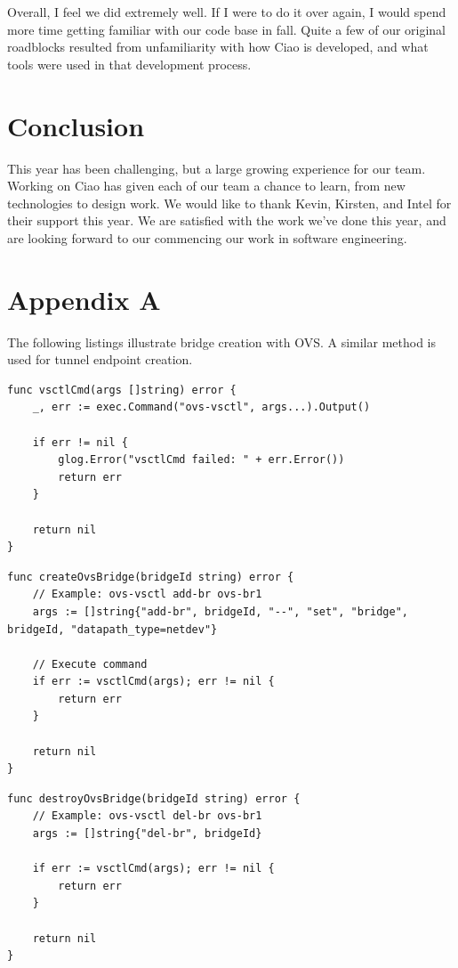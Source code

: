 \documentclass[10pt,onecolumn,journal,draftclsnofoot]{IEEEtran}
\begin{document}
Overall, I feel we did extremely well. If I were to do it over again, I would spend more time getting familiar with our code base in fall. Quite a few of our original roadblocks resulted from unfamiliarity with how Ciao is developed, and what tools were used in that development process.

\section{Conclusion}
This year has been challenging, but a large growing experience for our team. Working on Ciao has given each of our team a chance to learn, from new technologies to design work. We would like to thank Kevin, Kirsten, and Intel for their support this year. We are satisfied with the work we've done this year, and are looking forward to our commencing our work in software engineering.




\section{Appendix A}
The following listings illustrate bridge creation with OVS. A similar method is used for tunnel endpoint creation.

\begin{lstlisting}[caption=Calling the OVS command tool]
func vsctlCmd(args []string) error {
	_, err := exec.Command("ovs-vsctl", args...).Output()

	if err != nil {
		glog.Error("vsctlCmd failed: " + err.Error())
		return err
	}

	return nil
}
\end{lstlisting}

\begin{lstlisting}[caption=Creating an OVS bridge]
func createOvsBridge(bridgeId string) error {
	// Example: ovs-vsctl add-br ovs-br1
	args := []string{"add-br", bridgeId, "--", "set", "bridge", bridgeId, "datapath_type=netdev"}

	// Execute command
	if err := vsctlCmd(args); err != nil {
		return err
	}

	return nil
}
\end{lstlisting}

\begin{lstlisting}[caption=Destroying an OVS bridge]
func destroyOvsBridge(bridgeId string) error {
	// Example: ovs-vsctl del-br ovs-br1
	args := []string{"del-br", bridgeId}

	if err := vsctlCmd(args); err != nil {
		return err
	}

	return nil
}
\end{lstlisting}
\end{document}
